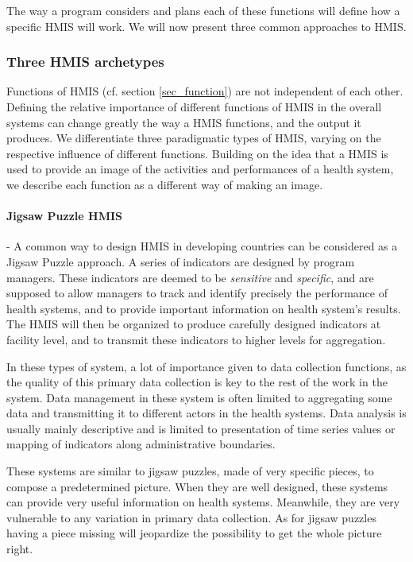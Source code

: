 The way a program considers and plans each of these functions will define how a specific HMIS will work. We will now present three common approaches to HMIS.

        \subsubsection{Three HMIS archetypes}

Functions of HMIS (cf. section \ref{sec_function}) are not independent of each other. Defining the relative importance of different functions of HMIS in the overall systems can change greatly the way a HMIS functions, and the output it produces. We differentiate three paradigmatic types of HMIS, varying on the respective influence of different functions. Building on the idea that a HMIS is used to provide an image of the activities and performances of a health system, we describe each function as a different way of making an image.

\paragraph{Jigsaw Puzzle HMIS} - A common way to design HMIS in developing countries can be considered as a Jigsaw Puzzle approach. A series of indicators are designed by program managers. These indicators are deemed to be \textit{sensitive} and \textit{specific}, and are supposed to allow managers to track and identify precisely the performance of health systems, and to provide important information on health system's results. The HMIS will then be organized to produce carefully designed indicators at facility level, and to transmit these indicators to higher levels for aggregation.

In these types of system, a lot of importance given to data collection functions, as the quality of this primary data collection is key to the rest of the work in the system. Data management in these system is often limited to aggregating some data and transmitting it to different actors in the health systems. Data analysis is usually mainly descriptive and is limited to presentation of time series values or mapping of indicators along administrative boundaries.

These systems are similar to jigsaw puzzles, made of very specific pieces, to compose a predetermined picture. When they are well designed, these systems can provide very useful information on health systems. Meanwhile, they are very vulnerable to any variation in primary data collection. As for jigsaw puzzles having a piece missing will jeopardize the possibility to get the whole picture right.

